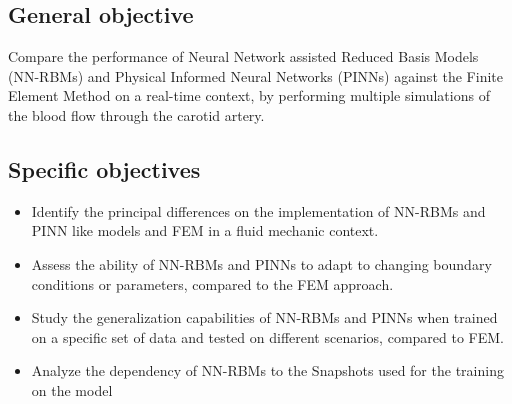 \documentclass[12pt,letterpaper]{article}
\begin{document}
\subsection{General objective}

Compare the performance of Neural Network assisted Reduced Basis Models (NN-RBMs) and Physical Informed Neural Networks (PINNs) against the Finite Element Method on a real-time context, by performing multiple simulations of the blood flow through the carotid artery.

\subsection{Specific objectives}

\begin{itemize}
  \item Identify the principal differences on the implementation of NN-RBMs and PINN like models and FEM in a fluid mechanic context.
  \item Assess the ability of NN-RBMs and PINNs to adapt to changing boundary conditions or parameters, compared to the FEM approach.
  \item  Study the generalization capabilities of NN-RBMs and PINNs when trained on a specific set of data and tested on different scenarios, compared to FEM.
  \item Analyze the dependency of NN-RBMs to the Snapshots used for the training on the model
\end{itemize}
\end{document}
